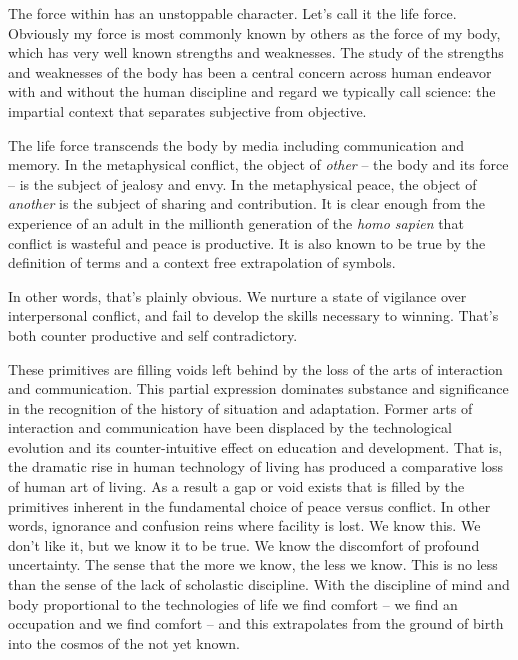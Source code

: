 

The force within has an unstoppable character.  Let's call it the life
force.  Obviously my force is most commonly known by others as the
force of my body, which has very well known strengths and weaknesses.
The study of the strengths and weaknesses of the body has been a
central concern across human endeavor with and without the human
discipline and regard we typically call science: the impartial context
that separates subjective from objective.

The life force transcends the body by media including communication
and memory.  In the metaphysical conflict, the object of {\it other}
-- the body and its force -- is the subject of jealosy and envy.  In
the metaphysical peace, the object of {\it another} is the subject of
sharing and contribution.  It is clear enough from the experience of
an adult in the millionth generation of the {\it homo sapien} that
conflict is wasteful and peace is productive.  It is also known to be
true by the definition of terms and a context free extrapolation of
symbols.  

In other words, that's plainly obvious.  We nurture a state of
vigilance over interpersonal conflict, and fail to develop the skills
necessary to winning.  That's both counter productive and self
contradictory.  

These primitives are filling voids left behind by the loss of the arts
of interaction and communication.  This partial expression dominates
substance and significance in the recognition of the history of
situation and adaptation.  Former arts of interaction and
communication have been displaced by the technological evolution and
its counter-intuitive effect on education and development.  That is,
the dramatic rise in human technology of living has produced a
comparative loss of human art of living.  As a result a gap or void
exists that is filled by the primitives inherent in the fundamental
choice of peace versus conflict.  In other words, ignorance and
confusion reins where facility is lost.  We know this.  We don't like
it, but we know it to be true.  We know the discomfort of profound
uncertainty.  The sense that the more we know, the less we know.  This
is no less than the sense of the lack of scholastic discipline.  With
the discipline of mind and body proportional to the technologies of
life we find comfort -- we find an occupation and we find comfort --
and this extrapolates from the ground of birth into the cosmos of the
not yet known.


\bye
